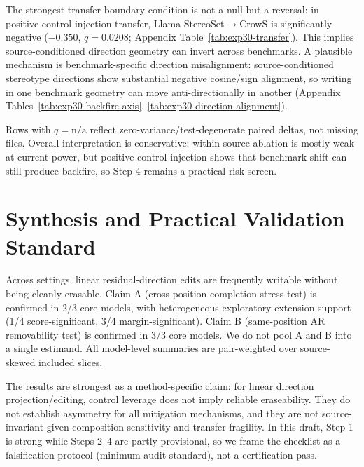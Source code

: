 The strongest transfer boundary condition is not a null but a reversal: in positive-control injection transfer, Llama StereoSet$\rightarrow$CrowS is significantly negative ($-0.350$, $q=0.0208$; Appendix Table~\ref{tab:exp30-transfer}). This implies source-conditioned direction geometry can invert across benchmarks. A plausible mechanism is benchmark-specific direction misalignment: source-conditioned stereotype directions show substantial negative cosine/sign alignment, so writing in one benchmark geometry can move anti-directionally in another (Appendix Tables~\ref{tab:exp30-backfire-axis}, \ref{tab:exp30-direction-alignment}).

Rows with $q=\mathrm{n/a}$ reflect zero-variance/test-degenerate paired deltas, not missing files. Overall interpretation is conservative: within-source ablation is mostly weak at current power, but positive-control injection shows that benchmark shift can still produce backfire, so Step 4 remains a practical risk screen.

\section{Synthesis and Practical Validation Standard}
\label{sec:synthesis}

Across settings, linear residual-direction edits are frequently writable without being cleanly erasable. Claim A (cross-position completion stress test) is confirmed in 2/3 core models, with heterogeneous exploratory extension support (1/4 score-significant, 3/4 margin-significant). Claim B (same-position AR removability test) is confirmed in 3/3 core models. We do not pool A and B into a single estimand. All model-level summaries are pair-weighted over source-skewed included slices.

The results are strongest as a method-specific claim: for linear direction projection/editing, control leverage does not imply reliable eraseability. They do not establish asymmetry for all mitigation mechanisms, and they are not source-invariant given composition sensitivity and transfer fragility. In this draft, Step 1 is strong while Steps 2--4 are partly provisional, so we frame the checklist as a falsification protocol (minimum audit standard), not a certification pass.

